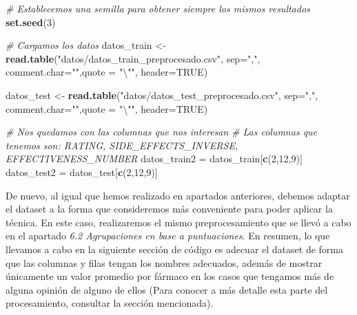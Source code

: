 \documentclass[spanish,]{article}
\newenvironment{Shaded}{\begin{snugshade}}{\end{snugshade}}
\newcommand{\KeywordTok}[1]{\textcolor[rgb]{0.13,0.29,0.53}{\textbf{#1}}}
\newcommand{\DataTypeTok}[1]{\textcolor[rgb]{0.13,0.29,0.53}{#1}}
\newcommand{\DecValTok}[1]{\textcolor[rgb]{0.00,0.00,0.81}{#1}}
\newcommand{\CharTok}[1]{\textcolor[rgb]{0.31,0.60,0.02}{#1}}
\newcommand{\StringTok}[1]{\textcolor[rgb]{0.31,0.60,0.02}{#1}}
\newcommand{\CommentTok}[1]{\textcolor[rgb]{0.56,0.35,0.01}{\textit{#1}}}
\newcommand{\OtherTok}[1]{\textcolor[rgb]{0.56,0.35,0.01}{#1}}
\newcommand{\NormalTok}[1]{#1}
\begin{document}
\begin{Shaded}
\begin{Highlighting}[]
\CommentTok{# Establecemos una semilla para obtener siempre los mismos resultados}
\KeywordTok{set.seed}\NormalTok{(}\DecValTok{3}\NormalTok{)}

\CommentTok{# Cargamos los datos}
\NormalTok{datos_train <-}\StringTok{ }\KeywordTok{read.table}\NormalTok{(}\StringTok{"datos/datos_train_preprocesado.csv"}\NormalTok{, }\DataTypeTok{sep=}\StringTok{","}\NormalTok{, }
                          \DataTypeTok{comment.char=}\StringTok{""}\NormalTok{,}\DataTypeTok{quote =} \StringTok{"}\CharTok{\textbackslash{}"}\StringTok{"}\NormalTok{, }\DataTypeTok{header=}\OtherTok{TRUE}\NormalTok{)}

\NormalTok{datos_test <-}\StringTok{ }\KeywordTok{read.table}\NormalTok{(}\StringTok{"datos/datos_test_preprocesado.csv"}\NormalTok{, }\DataTypeTok{sep=}\StringTok{","}\NormalTok{, }
                         \DataTypeTok{comment.char=}\StringTok{""}\NormalTok{,}\DataTypeTok{quote =} \StringTok{"}\CharTok{\textbackslash{}"}\StringTok{"}\NormalTok{, }\DataTypeTok{header=}\OtherTok{TRUE}\NormalTok{)}

\CommentTok{# Nos quedamos con las columnas que nos interesan }
\CommentTok{# Las columnas que tenemos son: RATING, SIDE_EFFECTS_INVERSE, EFFECTIVENESS_NUMBER}
\NormalTok{datos_train2 =}\StringTok{ }\NormalTok{datos_train[}\KeywordTok{c}\NormalTok{(}\DecValTok{2}\NormalTok{,}\DecValTok{12}\NormalTok{,}\DecValTok{9}\NormalTok{)]}
\NormalTok{datos_test2 =}\StringTok{ }\NormalTok{datos_test[}\KeywordTok{c}\NormalTok{(}\DecValTok{2}\NormalTok{,}\DecValTok{12}\NormalTok{,}\DecValTok{9}\NormalTok{)]}
\end{Highlighting}
\end{Shaded}

De nuevo, al igual que hemos realizado en apartados anteriores, debemos
adaptar el dataset a la forma que consideremos más conveniente para
poder aplicar la técnica. En este caso, realizaremos el mismo
preprocesamiento que se llevó a cabo en el apartado \emph{6.2
Agrupaciones en base a puntuaciones}. En resumen, lo que llevamos a cabo
en la siguiente sección de código es adecuar el dataset de forma que las
columnas y filas tengan los nombres adecuados, además de mostrar
únicamente un valor promedio por fármaco en los casos que tengamos más
de alguna opinión de alguno de ellos (Para conocer a más detalle esta
parte del procesamiento, consultar la sección mencionada).
\end{document}

